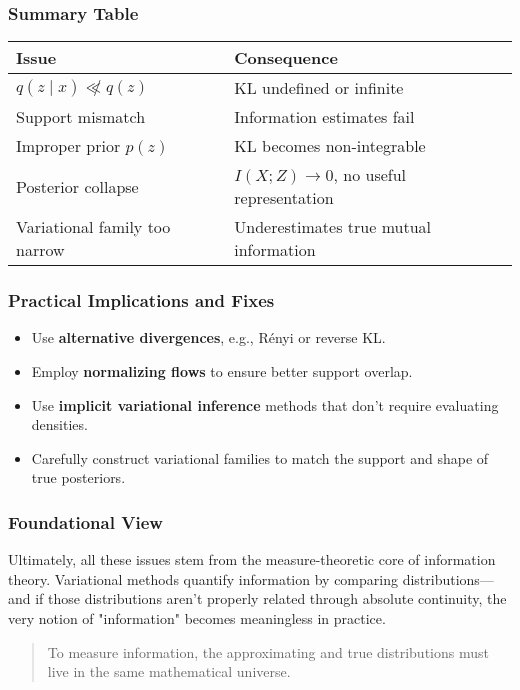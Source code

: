 \subsubsection{Summary Table}

\begin{center}
\begin{tabular}{|l|l|}
\hline
\textbf{Issue} & \textbf{Consequence} \\
\hline
\( q(z \mid x) \not\ll q(z) \) & KL undefined or infinite \\
Support mismatch & Information estimates fail \\
Improper prior \( p(z) \) & KL becomes non-integrable \\
Posterior collapse & \( I(X; Z) \to 0 \), no useful representation \\
Variational family too narrow & Underestimates true mutual information \\
\hline
\end{tabular}
\end{center}

\subsubsection{Practical Implications and Fixes}

\begin{itemize}
    \item Use \textbf{alternative divergences}, e.g., Rényi or reverse KL.
    \item Employ \textbf{normalizing flows} to ensure better support overlap.
    \item Use \textbf{implicit variational inference} methods that don’t require evaluating densities.
    \item Carefully construct variational families to match the support and shape of true posteriors.
\end{itemize}

\subsubsection{Foundational View}

Ultimately, all these issues stem from the measure-theoretic core of information theory. Variational methods quantify information by comparing distributions—and if those distributions aren’t properly related through absolute continuity, the very notion of "information" becomes meaningless in practice.

\begin{quote}
To measure information, the approximating and true distributions must live in the same mathematical universe.
\end{quote}


